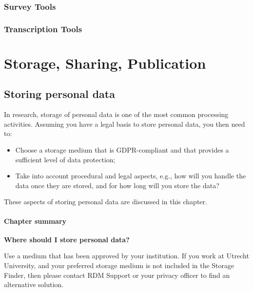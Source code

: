 \documentclass[
]{book}
\providecommand{\tightlist}{%
  \setlength{\itemsep}{0pt}\setlength{\parskip}{0pt}}
\begin{document}
\hypertarget{survey-tools}{%
\section{Survey Tools}\label{survey-tools}}

\hypertarget{transcription-tools}{%
\section{Transcription Tools}\label{transcription-tools}}

\hypertarget{part-storage-sharing-publication}{%
\part*{Storage, Sharing, Publication}\label{part-storage-sharing-publication}}

\hypertarget{data-storage}{%
\chapter{Storing personal data}\label{data-storage}}

In research, storage of personal data is one of the most common processing
activities. Assuming you have a legal basis to store personal data, you
then need to:

\begin{itemize}
\tightlist
\item
  Choose a storage medium that is GDPR-compliant and that provides a sufficient
  level of data protection;
\item
  Take into account procedural and legal aspects, e.g., how will you handle the
  data once they are stored, and for how long will you store the data?
\end{itemize}

These aspects of storing personal data are discussed in this chapter.

\hypertarget{chapter-summary-1}{%
\subsection{Chapter summary}\label{chapter-summary-1}}

\textbf{Where should I store personal data?}

Use a medium that has been approved by your institution. If you work at Utrecht
University, and your preferred storage medium is not included in the
Storage Finder,
then please contact
RDM Support
or your privacy officer
to find an alternative solution.
\end{document}
